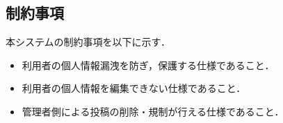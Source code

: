 \subsection{制約事項}
本システムの制約事項を以下に示す．
\begin{itemize}
    \item 利用者の個人情報漏洩を防ぎ，保護する仕様であること．
    \item 利用者の個人情報を編集できない仕様であること．
    \item 管理者側による投稿の削除・規制が行える仕様であること．
\end{itemize}